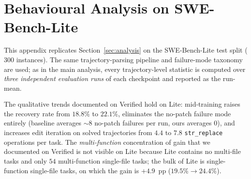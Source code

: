 
\section{Behavioural Analysis on SWE-Bench-Lite}
\label{app:behavior_lite}

This appendix replicates Section~\ref{sec:analysis} on the
SWE-Bench-Lite test split ($300$ instances). The same trajectory-parsing
pipeline and failure-mode taxonomy are used; as in the main analysis, every
trajectory-level statistic is computed over \emph{three independent
evaluation runs} of each checkpoint and reported as the run-mean.

The qualitative trends documented on Verified hold on Lite: mid-training
raises the recovery rate from $18.8\%$ to $22.1\%$, eliminates the no-patch
failure mode entirely (baseline averages $\sim\!8$ no-patch failures per run,
ours averages $0$), and increases edit iteration on solved trajectories from
$4.4$ to $7.8$ \texttt{str\_replace} operations per task.
The \emph{multi-function} concentration of gain that we documented on
Verified is not visible on Lite because Lite contains no multi-file tasks
and only $54$ multi-function single-file tasks; the bulk of Lite is
single-function single-file tasks, on which the gain is $+4.9$~pp
($19.5\% \to 24.4\%$).

